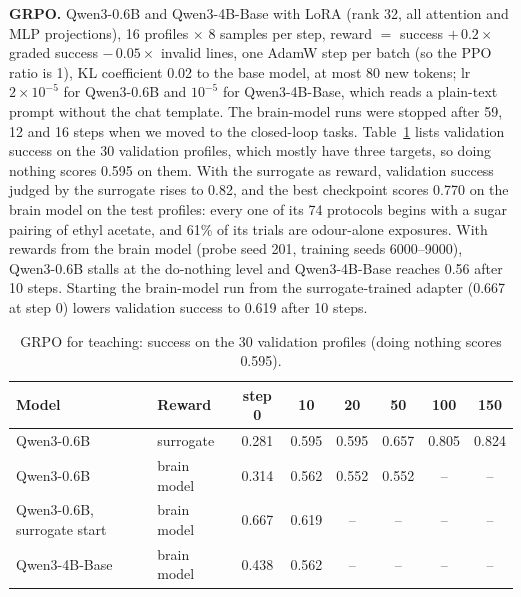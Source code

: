 \textbf{GRPO.} Qwen3-0.6B and Qwen3-4B-Base with LoRA (rank 32, all attention and MLP projections), 16 profiles $\times$ 8 samples per step, reward $=$ success $+\,0.2\times$ graded success $-\,0.05\times$ invalid lines, one AdamW step per batch (so the PPO ratio is 1), KL coefficient 0.02 to the base model, at most 80 new tokens; lr $2\times10^{-5}$ for Qwen3-0.6B and $10^{-5}$ for Qwen3-4B-Base, which reads a plain-text prompt without the chat template. The brain-model runs were stopped after 59, 12 and 16 steps when we moved to the closed-loop tasks. Table~\ref{tab:teachgrpo} lists validation success on the 30 validation profiles, which mostly have three targets, so doing nothing scores 0.595 on them. With the surrogate as reward, validation success judged by the surrogate rises to 0.82, and the best checkpoint scores 0.770 on the brain model on the test profiles: every one of its 74 protocols begins with a sugar pairing of ethyl acetate, and 61\% of its trials are odour-alone exposures. With rewards from the brain model (probe seed 201, training seeds 6000--9000), Qwen3-0.6B stalls at the do-nothing level and Qwen3-4B-Base reaches 0.56 after 10 steps. Starting the brain-model run from the surrogate-trained adapter (0.667 at step 0) lowers validation success to 0.619 after 10 steps.

\begin{table}[h]
\centering
\caption{GRPO for teaching: success on the 30 validation profiles (doing nothing scores 0.595).}
\label{tab:teachgrpo}
\small
\begin{tabular}{llcccccc}
\toprule
Model & Reward & step 0 & 10 & 20 & 50 & 100 & 150 \\
\midrule
Qwen3-0.6B & surrogate & 0.281 & 0.595 & 0.595 & 0.657 & 0.805 & 0.824 \\
Qwen3-0.6B & brain model & 0.314 & 0.562 & 0.552 & 0.552 & -- & -- \\
Qwen3-0.6B, surrogate start & brain model & 0.667 & 0.619 & -- & -- & -- & -- \\
Qwen3-4B-Base & brain model & 0.438 & 0.562 & -- & -- & -- & -- \\
\bottomrule
\end{tabular}
\end{table}

